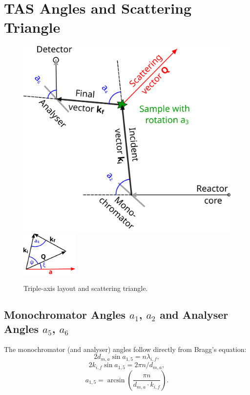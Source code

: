 \documentclass[english]{book}
\begin{document}




\section{TAS Angles and Scattering Triangle}
\begin{figure}
\begin{center}
	\includegraphics[width = 0.5 \textwidth]{tas}
	\hspace{1.5cm}
	\includegraphics[trim=0 -2cm 0 0, width=0.25\textwidth]{triangle}
\end{center}
\caption{Triple-axis layout and scattering triangle.}
\end{figure}

\subsection*{Monochromator Angles $a_1$, $a_2$ and Analyser Angles $a_5$, $a_6$}

The monochromator (and analyser) angles follow directly from Bragg's equation:
\begin{equation} 2 d_{m,a}\sin a_{1,5} = n \lambda_{i,f}, \end{equation}
\begin{equation} 2 k_{i,f} \sin a_{1,5} = 2 \pi n / d_{m,a}, \end{equation}
\begin{equation} \boxed{ a_{1,5} = \arcsin \left( \frac{\pi n}{d_{m,a} \cdot k_{i,f}} \right). } \end{equation}
\end{document}
